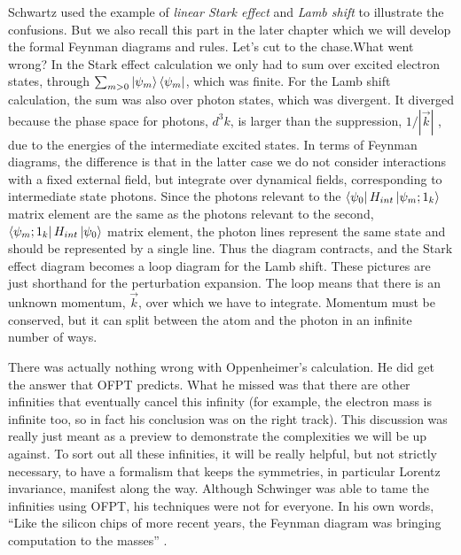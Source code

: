 \documentclass[12pt,openany]{book}
\begin{document}
	Schwartz used the example of \textit{linear Stark effect} and \textit{Lamb shift} to illustrate the confusions. But we also recall this part in the later chapter which we will develop the 
	formal Feynman diagrams and rules. Let's cut to the chase.What went wrong? 
	In the Stark effect calculation we only had to sum over excited electron states, through $\sum_{m>0}\ket{\psi_m}\bra{\psi_m}$, which was finite. 
	For the Lamb shift calculation, the sum was also over photon states, which was divergent. 
	It diverged because the phase space for photons, $d^3k$, is larger than the suppression, $1/|\vec{k}|$ , due to the energies  of the intermediate excited states. 
	In terms of Feynman diagrams, the difference is that in the latter case we do not consider interactions with a fixed external field, but integrate over dynamical fields, corresponding to intermediate state photons. 
	Since the photons relevant to the $\bra{\psi_0}H_{int}\ket{\psi_m;1_k}$ matrix element are the same as the photons relevant to the second, $\bra{\psi_m;1_k}H_{int}\ket{\psi_0}$ matrix element, the photon lines represent the same state and should be represented by a single line. Thus the diagram contracts,
	and the Stark effect diagram becomes a loop diagram for the Lamb shift. 
	These pictures are just shorthand for the perturbation expansion.
	The loop means that there is an unknown momentum, $\vec{k}$, over which we have to integrate. Momentum must be conserved, but it can split between the atom and the photon in an infinite number of ways.\par 
	There was actually nothing wrong with Oppenheimer’s calculation.
	He did get the answer that OFPT predicts.
	What he missed was that there are other infinities that eventually cancel this infinity (for example, the electron mass is infinite too, so in fact his conclusion was on the right track). 
	This discussion was really just meant as a preview to demonstrate the complexities we will be up against.
	To sort out all these infinities, it will be really helpful, but not strictly necessary, to have a formalism that keeps the symmetries, in particular Lorentz invariance, manifest along the way. 
	Although Schwinger was able to tame the infinities using OFPT, his techniques were not for everyone. 
	In his own words, “Like the silicon chips of more recent years, the Feynman diagram was bringing computation to the masses” .
	
	
\end{document}
